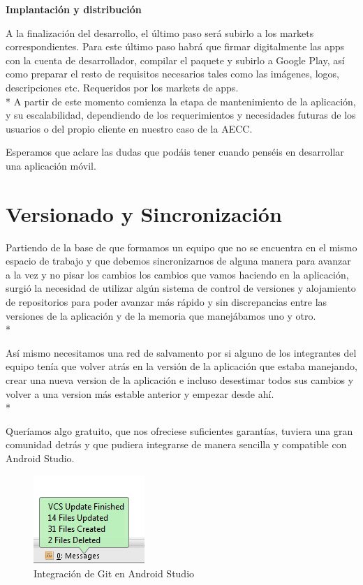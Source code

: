 \documentclass[../pfc.tex]{subfiles}
\begin{document}
	\textbf{Implantación y distribución}
	
	A la finalización del desarrollo, el último paso será subirlo a los markets correspondientes. Para este último paso habrá que firmar digitalmente las apps con la cuenta de desarrollador, compilar el paquete y subirlo a Google Play, así como preparar el resto de requisitos necesarios tales como las imágenes, logos, descripciones etc. Requeridos por los markets de apps.\\*
	A partir de este momento comienza la etapa de mantenimiento de la aplicación, y su escalabilidad, dependiendo de los requerimientos y necesidades futuras de los usuarios o del propio cliente en  nuestro caso de la AECC.
	
	Esperamos que aclare las dudas que podáis tener cuando penséis en desarrollar una aplicación móvil.
	
	\section{Versionado y Sincronización}
	Partiendo de la base de que formamos un equipo que no se encuentra en el mismo espacio de trabajo y que debemos sincronizarnos de alguna manera para avanzar a la vez y no pisar los cambios los cambios que vamos haciendo en la aplicación, surgió la necesidad de utilizar algún sistema de control de versiones y alojamiento de repositorios para poder avanzar más rápido y sin discrepancias entre las versiones de la aplicación y de la memoria que manejábamos uno y otro.\\*
	
	Así mismo necesitamos una red de salvamento por si alguno de los integrantes del equipo tenía que volver atrás en la versión de la aplicación que estaba manejando, crear una nueva version de la aplicación e incluso desestimar todos sus cambios y volver a una version más estable anterior y empezar desde ahí.\\*
		
	Queríamos algo gratuito, que nos ofreciese suficientes garantías, tuviera una gran comunidad detrás y que pudiera integrarse de manera sencilla y compatible con Android Studio. 
	
	\begin{figure}[H]
		\centering
		\includegraphics[width=0.4\linewidth]{../images/VCS}
		\caption{Integración de Git en Android Studio}
		\label{fig:VCS}
	\end{figure}
\end{document}
